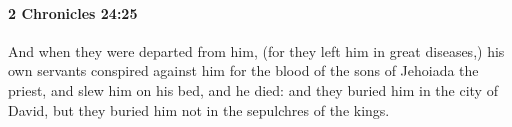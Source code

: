 
		\paragraph{2 Chronicles 24:25} %
			\label{2CHRONICLES-24-25}

			And when they were departed from him, (for they left him in great diseases,) his own servants conspired against him for the blood of the sons of Jehoiada the priest, and slew him on his bed, and he died: and they buried him in the city of David, but they buried him not in the sepulchres of the kings.


